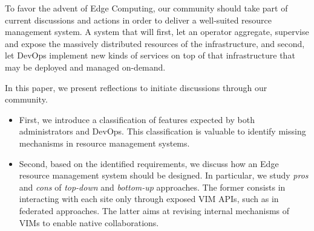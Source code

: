 To favor the advent of Edge Computing, our community should take part
of current discussions and actions in order to deliver a well-suited
resource management system. A system that will first, let an operator aggregate, supervise and expose the massively distributed resources of the infrastructure,
and second, let DevOps implement new kinds of services on top of that infrastructure that may be deployed and managed on-demand.


In this paper, we present reflections to initiate discussions through our community.

\begin{itemize}[noitemsep, topsep=0pt]
\item First, we introduce a classification of features expected by 
  both administrators and DevOps. This classification is valuable to
  identify missing mechanisms in resource management systems.
\item Second, based on the identified requirements, we discuss
  how an Edge resource management system
  should be designed. In particular, we study \emph{pros} and
  \emph{cons} of \emph{top-down} and \emph{bottom-up} approaches. The
  former consists in interacting with each site only through
  exposed VIM APIs, such as in federated approaches. The
  latter aims at revising internal mechanisms of VIMs to enable native
  collaborations.
  \end{itemize}

